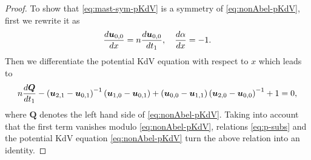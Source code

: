 \documentclass[10pt,a4paper]{amsart}
\newcommand{\bsu}{ {\bs{u}}}
\newcommand{\bs}{\boldsymbol}
\begin{document}
\begin{proof}
		To show that \eqref{eq:mast-sym-pKdV} is a symmetry of \eqref{eq:nonAbel-pKdV}, first we rewrite it as
		\begin{equation}\label{eq:mast-sym-pKdV-v2}
			\frac{{\rm{d}} {\bs{u}}_{0,0}}{{\rm{d}} x} =  n \frac{{\rm{d}} {\bs{u}}_{0,0}}{{\rm{d}} t_1}, ~~~ 	\frac{{\rm{d}} \alpha}{{\rm{d}} x} = -1.
		\end{equation}
		Then we differentiate the potential KdV equation with respect to $x$ which leads  to
		$$ n \frac{{\rm{d}} {\bs{Q}}}{{\rm{d}} t_1} - \left(\bsu_{2,1}- \bsu_{0,1}\right)^{-1} \left(\bsu_{1,0}- \bsu_{0,1}\right) + \left(\bsu_{0,0}- \bsu_{1,1}\right) \left(\bsu_{2,0}- \bsu_{0,0}\right)^{-1} +1 = 0, $$
		where ${\bs{Q}}$ denotes the left hand side of \eqref{eq:nonAbel-pKdV}. Taking into account that the first term vanishes modulo \eqref{eq:nonAbel-pKdV}, relations \eqref{eq:p-subs} and the potential KdV equation \eqref{eq:nonAbel-pKdV} turn the above relation into an identity.
	\end{proof}
\end{document}
